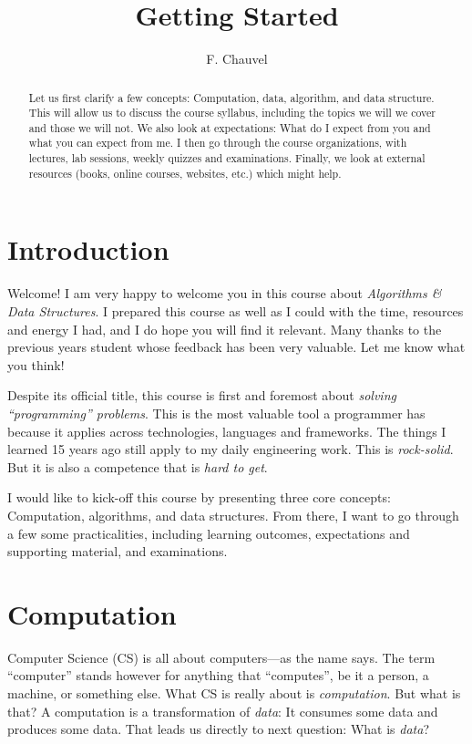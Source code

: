\documentclass{aldast}
\title{Getting Started}
\author{F. Chauvel}
\begin{document}
\maketitle

\begin{abstract}
  Let us first clarify a few concepts: Computation, data, algorithm,
  and data structure. This will allow us to discuss the course
  syllabus, including the topics we will we cover and those we will
  not. We also look at expectations: What do I expect from you and
  what you can expect from me. I then go through the course
  organizations, with lectures, lab sessions, weekly quizzes and
  examinations. Finally, we look at external resources (books, online
  courses, websites, etc.) which might help.
\end{abstract}


\section*{Introduction}
Welcome! I am very happy to
welcome you in this course about \emph{Algorithms \& Data
  Structures}. I prepared this course as well as I could with the
time, resources and energy I had, and I do hope you will find it
relevant. Many thanks to the previous years student whose feedback has
been very valuable. Let me know what you think!

Despite its official title, this course is first and foremost about
\emph{solving ``programming'' problems}. This is the most valuable
tool a programmer has because it applies across technologies,
languages and frameworks. The things I learned 15 years ago still apply
to my daily engineering work. This is \emph{rock-solid}. But it is
also a competence that is \emph{hard to get}.

I would like to kick-off this course by presenting three core
concepts: Computation, algorithms, and data structures. From there, I
want to go through a few some practicalities, including learning
outcomes, expectations and supporting material, and examinations.


\section{Computation}
Computer Science (CS) is all about computers---as the name says. The
term ``computer'' stands however for anything that ``computes'', be it
a person, a machine, or something else. What CS is really about is
\emph{computation}. But what is that? A computation is a
transformation of \emph{data}: It consumes some data and produces some
data. That leads us directly to next question: What is \emph{data}?
\end{document}

